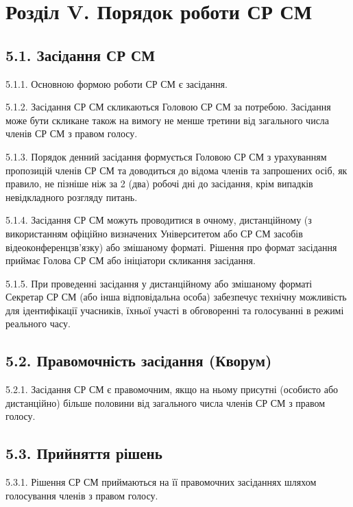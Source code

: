 \section*{Розділ V. Порядок роботи СР СМ}

\subsection*{5.1. Засідання СР СМ}
    5.1.1. Основною формою роботи СР СМ є засідання.

    5.1.2. Засідання СР СМ скликаються Головою СР СМ за потребою. Засідання може бути скликане також на вимогу не менше третини від загального числа членів СР СМ з правом голосу.

    5.1.3. Порядок денний засідання формується Головою СР СМ з урахуванням пропозицій членів СР СМ та доводиться до відома членів та запрошених осіб, як правило, не пізніше ніж за 2 (два) робочі дні до засідання, крім випадків невідкладного розгляду питань.

    5.1.4. Засідання СР СМ можуть проводитися в очному, дистанційному (з використанням офіційно визначених Університетом або СР СМ засобів відеоконференцзв'язку) або змішаному форматі. Рішення про формат засідання приймає Голова СР СМ або ініціатори скликання засідання.

    5.1.5. При проведенні засідання у дистанційному або змішаному форматі Секретар СР СМ (або інша відповідальна особа) забезпечує технічну можливість для ідентифікації учасників, їхньої участі в обговоренні та голосуванні в режимі реального часу.

\subsection*{5.2. Правомочність засідання (Кворум)}
    5.2.1. Засідання СР СМ є правомочним, якщо на ньому присутні (особисто або дистанційно) більше половини від загального числа членів СР СМ з правом голосу.

\subsection*{5.3. Прийняття рішень}
    5.3.1. Рішення СР СМ приймаються на її правомочних засіданнях шляхом голосування членів з правом голосу.

